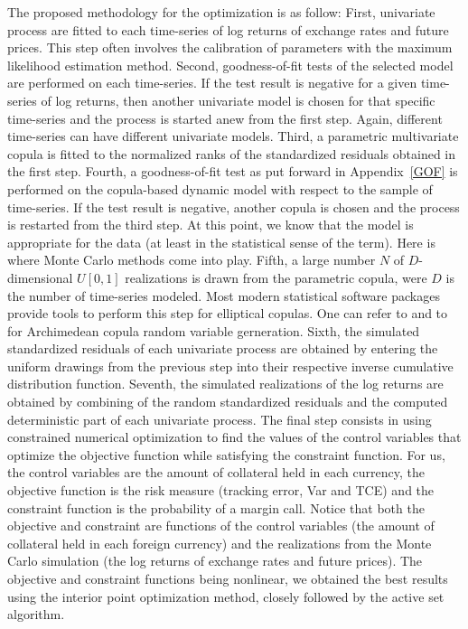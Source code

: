 The proposed methodology for the optimization is as follow: First,
univariate process are fitted to each time-series of log returns of
exchange rates and future prices. This step often involves the
calibration of parameters with the maximum likelihood estimation
method. Second, goodness-of-fit tests of the selected model are
performed on each time-series. If the test result is negative for a
given time-series of log returns, then another univariate model is
chosen for that specific time-series and the process is started anew
from the first step. Again, different time-series can have different
univariate models. Third, a parametric multivariate copula is fitted
to the normalized ranks of the standardized residuals obtained in
the first step. Fourth, a goodness-of-fit test as put forward in
Appendix~\ref{GOF} is performed on the copula-based dynamic model
with respect to the sample of time-series. If the test result is
negative, another copula is chosen and the process is restarted from
the third step. At this point, we know that the model is appropriate
for the data (at least in the statistical sense of the term). Here
is where Monte Carlo methods come into play. Fifth, a large number
$N$ of $D$-dimensional $U[0,1]$ realizations is drawn from the
parametric copula, were $D$ is the number of time-series modeled.
Most modern statistical software packages provide tools to perform
this step for elliptical copulas. One can refer to \cite{marshallolkin88}
and to \cite{melchiori06} for Archimedean copula random variable
gerneration. Sixth, the simulated standardized residuals
of each univariate process are obtained by entering the uniform
drawings from the previous step into their respective inverse
cumulative distribution function. Seventh, the simulated
realizations of the log returns are obtained by combining of the
random standardized residuals and the computed deterministic part of
each univariate process. The final step consists in using
constrained numerical optimization to find the values of the control
variables that optimize the objective function while satisfying the
constraint function. For us, the control variables are the amount of
collateral held in each currency, the objective function is the risk
measure (tracking error, Var and TCE) and the constraint function is
the probability of a margin call. Notice that both the objective and
constraint are functions of the control variables (the amount of
collateral held in each foreign currency) and the
realizations from the Monte Carlo simulation (the log returns of
exchange rates and future prices). The objective and constraint
functions being nonlinear, we obtained the best results using the
interior point optimization method, closely followed by the active
set algorithm.

